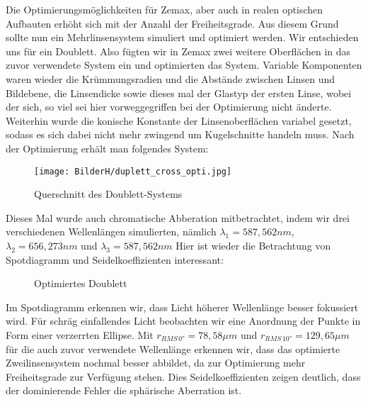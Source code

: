 \documentclass[twoside,colorback,accentcolor=tud4c,11pt]{tudreport}
\begin{document}
	Die Optimierungsmöglichkeiten für Zemax, aber auch in realen optischen Aufbauten erhöht sich mit der Anzahl der Freiheitsgrade. Aus diesem Grund sollte nun ein Mehrlinsensystem simuliert und optimiert werden. Wir entschieden uns für ein Doublett. Also fügten wir in Zemax zwei weitere Oberflächen in das zuvor verwendete System ein und optimierten das System. Variable Komponenten waren wieder die Krümmungsradien und die Abstände zwischen Linsen und Bildebene, die Linsendicke sowie dieses mal der Glastyp der ersten Linse, wobei der sich, so viel sei hier vorweggegriffen bei der Optimierung nicht änderte. Weiterhin wurde die konische Konstante der Linsenoberflächen variabel gesetzt, sodass es sich dabei nicht mehr zwingend um Kugelschnitte handeln muss. Nach der Optimierung erhält man folgendes System:
	
\begin{figure}[H]
\centering
   	\begin{minipage}[b]{\textwidth}
   	\centering
   	\texttt{[image: BilderH/duplett\_cross\_opti.jpg]}
   	\caption{Querschnitt des Doublett-Systems}
  	\end{minipage}
\end{figure}
	
	Dieses Mal wurde auch chromatische Abberation mitbetrachtet, indem wir drei verschiedenen Wellenlängen simulierten, nämlich $\lambda_1 = 587,562 nm$, $\lambda_2 = 656,273 nm$ und $\lambda_3 = 587,562 nm$
	Hier ist wieder die Betrachtung von Spotdiagramm und Seidelkoeffizienten interessant:
	
	\begin{figure}[H]
\centering
  \quad
  \quad   
  \caption{Optimiertes Doublett}
\end{figure}
	
	Im Spotdiagramm erkennen wir, dass Licht höherer Wellenlänge besser fokussiert wird. Für schräg einfallendes Licht beobachten wir eine Anordnung der Punkte in Form einer verzerrten Ellipse.
	  Mit $r_{RMS \, 0°} = 78,58 \mu m $ und $r_{RMS \, 10°} = 129,65 \mu m $ für die auch zuvor verwendete Wellenlänge erkennen wir, dass das optimierte Zweilinsensystem nochmal besser abbildet, da zur Optimierung mehr Freiheitsgrade zur Verfügung stehen. 
	 Dies Seidelkoeffizienten zeigen deutlich, dass der dominierende Fehler die sphärische Aberration ist. 
	 
\end{document}
